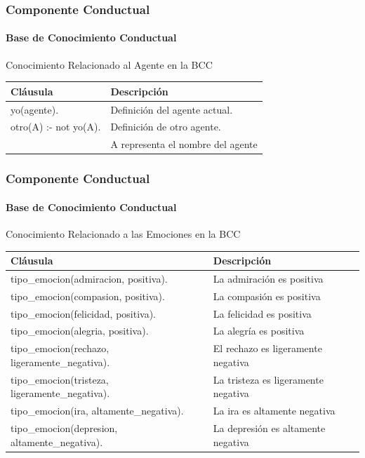 \documentclass{beamer}
\begin{document}
\begin{frame}
\frametitle{Componente Conductual}
\framesubtitle{Base de Conocimiento Conductual}
\centering
Conocimiento Relacionado al Agente en la BCC
\begin{table}[!ht]
\centering
\tiny
\begin{tabular}{ll}
\hline
\scriptsize \bfseries Cláusula & \scriptsize \bfseries Descripción \\
\hline
\hline
yo(agente). & Definición del agente actual. \\\hline
otro(A) :- not yo(A). & Definición de otro agente. \\ & A representa el nombre del agente \\
\hline
\end{tabular}
\end{table}
\end{frame}

\begin{frame}
\frametitle{Componente Conductual}
\framesubtitle{Base de Conocimiento Conductual}
\centering
Conocimiento Relacionado a las Emociones en la BCC
\begin{table}[!ht]
\centering
\tiny
\begin{tabular}{ll}
\hline
\scriptsize \bfseries Cláusula & \scriptsize \bfseries Descripción \\
\hline
\hline
tipo\_emocion(admiracion, positiva). & La admiración es positiva \\\hline
tipo\_emocion(compasion, positiva). & La compasión es positiva \\\hline
tipo\_emocion(felicidad, positiva). & La felicidad es positiva \\\hline
tipo\_emocion(alegria, positiva). & La alegría es positiva \\\hline
tipo\_emocion(rechazo, ligeramente\_negativa). & El rechazo es ligeramente negativa \\\hline
tipo\_emocion(tristeza, ligeramente\_negativa). & La tristeza es ligeramente negativa \\\hline
tipo\_emocion(ira, altamente\_negativa). & La ira es altamente negativa \\\hline
tipo\_emocion(depresion, altamente\_negativa). & La depresión es altamente negativa \\
\hline
\end{tabular}
\end{table}
\end{frame}
\end{document}
